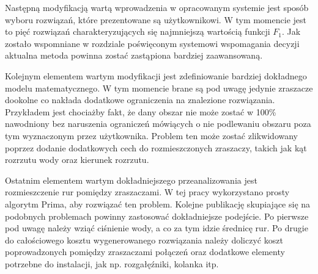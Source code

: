 \documentclass[twoside]{iisthesis}
\begin{document}
Następną modyfikacją wartą wprowadzenia w opracowanym systemie jest sposób wyboru rozwiązań, które prezentowane są użytkownikowi. W tym momencie jest to pięć rozwiązań charakteryzujących się najmniejszą wartością funkcji $F_{1}$. Jak zostało wspomniane w rozdziale poświęconym systemowi wspomagania decyzji aktualna metoda powinna zostać zastąpiona bardziej zaawansowaną.

Kolejnym elementem wartym modyfikacji jest zdefiniowanie bardziej dokładnego modelu matematycznego. W tym momencie brane są pod uwagę jedynie zraszacze dookolne co nakłada dodatkowe ograniczenia na znalezione rozwiązania. Przykładem jest chociażby fakt, że dany obszar nie może zostać w 100\% nawodniony bez naruszenia ograniczeń mówiących o nie podlewaniu obszaru poza tym wyznaczonym przez użytkownika. Problem ten może zostać zlikwidowany poprzez dodanie dodatkowych cech do rozmieszczonych zraszaczy, takich jak kąt rozrzutu wody oraz kierunek rozrzutu.

Ostatnim elementem wartym dokładniejszego przeanalizowania jest rozmieszczenie rur pomiędzy zraszaczami. W tej pracy wykorzystano prosty algorytm Prima, aby rozwiązać ten problem. Kolejne publikację skupiające się na podobnych problemach powinny zastosować dokładniejsze podejście. Po pierwsze pod uwagę należy wziąć ciśnienie wody, a co za tym idzie średnicę rur. Po drugie do całościowego kosztu wygenerowanego rozwiązania należy doliczyć koszt poprowadzonych pomiędzy zraszaczami połączeń oraz dodatkowe elementy potrzebne do instalacji, jak np. rozgałęźniki, kolanka itp.



\end{document}
